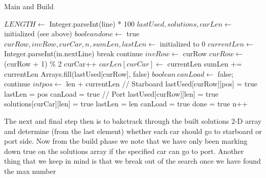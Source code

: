 \documentclass[12pt]{article}
\begin{document}
\begin{algorithm}[H]
\caption{Main and Build}
\begin{algorithmic}
            \State $LENGTH \gets$ Integer.parseInt(line) * 100
            \State $lastUsed, solutions, carLen \gets$ initialized (see above)
            \State $boolean done \gets$ true
            \State $curRow, invRow, curCar, n, sumLen, lastLen \gets$ initialized to 0
                \State $currentLen \gets$ Integer.parseInt(in.nextLine)
                    \State break
                \EndIf
                    \State continue
                \EndIf
                \State $invRow \gets$ curRow
                \State $curRow \gets$ (curRow + 1) \% 2
                \State curCar++
                \State $carLen[curCar] \gets$ currentLen
                \State sumLen += currentLen
                \State Arrays.fill(lastUsed[curRow], false)
                \State $boolean\ canLoad \gets$ false;
                        \State continue
                    \EndIf
                    \State $int pos \gets$ len + currentLen
                     // Starboard
                        \State lastUsed[curRow][pos] = true
                        \State lastLen = pos
                        \State canLoad = true
                    \EndIf
                     // Port
                        \State lastUsed[curRow][len] = true
                        \State solutions[curCar][len] = true
                        \State lastLen = len
                        \State canLoad = true
                    \EndIf
                \EndFor
                    \State done = true
                \Else
                    \State n++
                \EndIf
            \EndWhile
            \State {}
        \EndFor
    \EndProcedure
\end{algorithmic}
\end{algorithm}
\newpage
The next and final step then is to bakctrack through the built solutions 2-D array and
determine (from the last element) whether each car should go to starboard or port
side. Now from the build phase we note that we have only been marking down
true on the solutions array if the specified car can go to port. Another thing that we
keep in mind is that we break out of the search once we have found the max number
\end{document}
